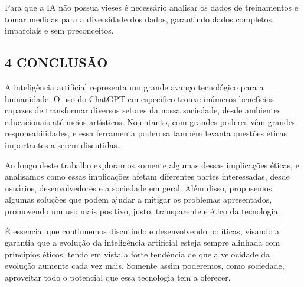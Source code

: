 Para que a IA não possua vieses é necessário analisar os dados de treinamentos e tomar medidas para a diversidade dos dados, garantindo dados completos, imparciais e sem preconceitos. 


\subsection*{\textbf{4 CONCLUSÃO}}
A inteligência artificial representa um grande avanço tecnológico para a humanidade. O uso do ChatGPT em específico trouxe inúmeros benefícios capazes de transformar diversos setores da nossa sociedade, desde ambientes educacionais até meios artísticos. No entanto, com grandes poderes vêm grandes responsabilidades, e essa ferramenta poderosa também levanta questões éticas importantes a serem discutidas.

Ao longo deste trabalho exploramos somente algumas dessas implicações éticas, e analisamos como essas implicações afetam diferentes partes interessadas, desde usuários, desenvolvedores e a sociedade em geral. Além disso, propusemos algumas soluções que podem ajudar a mitigar os problemas apresentados, promovendo um uso mais positivo, justo, transparente e ético da tecnologia.

É essencial que continuemos discutindo e desenvolvendo políticas, visando a garantia que a evolução da inteligência artificial esteja sempre alinhada com princípios éticos, tendo em vista a forte tendência de que a velocidade da evolução aumente cada vez mais. Somente assim poderemos, como sociedade, aproveitar todo o potencial que essa tecnologia tem a oferecer.